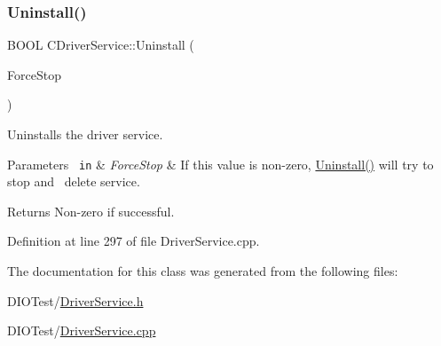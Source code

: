 \subsubsection{\texorpdfstring{Uninstall()}{Uninstall()}}
{\footnotesize\ttfamily B\+O\+OL C\+Driver\+Service\+::\+Uninstall (\begin{DoxyParamCaption}\item[{B\+O\+OL}]{Force\+Stop }\end{DoxyParamCaption})}



Uninstalls the driver service. 


\begin{DoxyParams}[1]{Parameters}
\mbox{\texttt{ in}}  & {\em Force\+Stop} & If this value is non-\/zero, \mbox{\hyperlink{class_c_driver_service_a52b6dc6a44270d9069f0e450d5a839d4}{Uninstall()}} will try to stop and~\newline
 delete service. \\
\hline
\end{DoxyParams}
\begin{DoxyReturn}{Returns}
Non-\/zero if successful. 
\end{DoxyReturn}


Definition at line 297 of file Driver\+Service.\+cpp.



The documentation for this class was generated from the following files\+:\begin{DoxyCompactItemize}
\item 
D\+I\+O\+Test/\mbox{\hyperlink{_driver_service_8h}{Driver\+Service.\+h}}\item 
D\+I\+O\+Test/\mbox{\hyperlink{_driver_service_8cpp}{Driver\+Service.\+cpp}}\end{DoxyCompactItemize}
